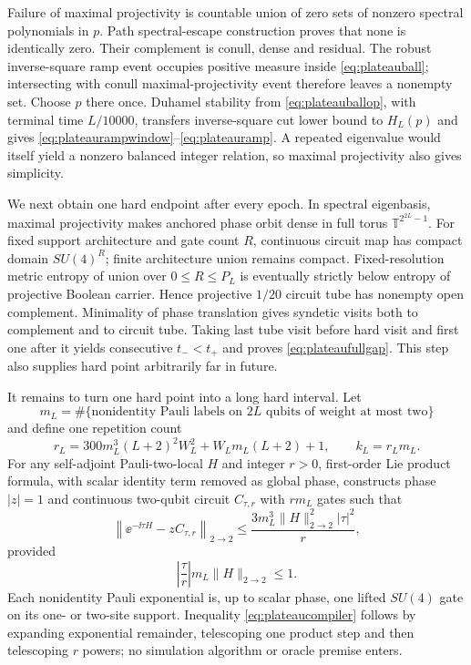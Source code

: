 Failure of maximal projectivity is countable union of zero sets of nonzero
spectral polynomials in $p$.  Path spectral-escape construction proves that
none is identically zero.  Their complement is conull, dense and residual.
The robust inverse-square ramp event occupies positive measure inside
\eqref{eq:plateauball}; intersecting with conull maximal-projectivity event
therefore leaves a nonempty set.  Choose $p$ there once.  Duhamel stability
from \eqref{eq:plateauballop}, with terminal time $L/10000$, transfers
inverse-square cut lower bound to $H_L(p)$ and gives
\eqref{eq:plateaurampwindow}--\eqref{eq:plateauramp}.  A repeated eigenvalue
would itself yield a nonzero balanced integer relation, so maximal
projectivity also gives simplicity.

We next obtain one hard endpoint after every epoch.  In spectral eigenbasis,
maximal projectivity makes anchored phase orbit dense in full torus
$\mathbb T^{2^{2L}-1}$.  For fixed support architecture and gate count $R$,
continuous circuit map has compact domain $SU(4)^R$; finite architecture
union remains compact.  Fixed-resolution metric entropy of union over
$0\le R\le P_L$ is eventually strictly below entropy of projective Boolean
carrier.  Hence projective $1/20$ circuit tube has nonempty open complement.
Minimality of phase translation gives syndetic visits both to complement and
to circuit tube.  Taking last tube visit before hard visit and first one after
it yields consecutive $t_-<t_+$ and proves
\eqref{eq:plateaufullgap}.  This step also supplies hard point arbitrarily
far in future.

It remains to turn one hard point into a long hard interval.  Let
\begin{equation}
 m_L=\#\{\text{nonidentity Pauli labels on $2L$ qubits of weight at most two}\}
\end{equation}
and define one repetition count
\begin{equation}
 r_L=300m_L^3(L+2)^2W_L^2+W_Lm_L(L+2)+1,
 \qquad k_L=r_Lm_L.                                  \label{eq:plateaurepetitions}
\end{equation}
For any self-adjoint Pauli-two-local $H$ and integer $r>0$, first-order Lie
product formula, with scalar identity term removed as global phase,
constructs phase $|z|=1$ and continuous two-qubit circuit $C_{\tau,r}$ with
$rm_L$ gates such that
\begin{equation}
 \left\|\ee^{-\ii\tau H}-zC_{\tau,r}\right\|_{2\to2}
 \le\frac{3m_L^3\|H\|_{2\to2}^2|\tau|^2}{r},       \label{eq:plateaucompiler}
\end{equation}
provided
\begin{equation}
 \left|\frac\tau r\right|m_L\|H\|_{2\to2}\le1.   \label{eq:plateaucompilercondition}
\end{equation}
Each nonidentity Pauli exponential is, up to scalar phase, one lifted
$SU(4)$ gate on its one- or two-site support.  Inequality
\eqref{eq:plateaucompiler} follows by expanding exponential remainder,
telescoping one product step and then telescoping $r$ powers; no simulation
algorithm or oracle premise enters.

